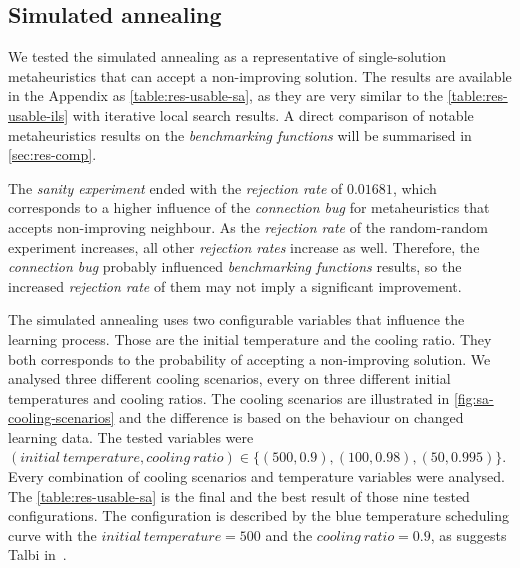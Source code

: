 \documentclass[
  print, %
  Table,   %
  nolof,     %
  nolot,     %
  11pt, %
  oneside  %
]{fithesis3}
\begin{document}
\subsection{Simulated annealing}
\label{subsec:res-ss-sa}

We tested the simulated annealing as a representative of single-solution metaheuristics that can accept a non-improving solution. The results are available in the Appendix as \cref{table:res-usable-sa}, as they are very similar to the \cref{table:res-usable-ils} with iterative local search results. A direct comparison of notable metaheuristics results on the \textit{benchmarking functions} will be summarised in \cref{sec:res-comp}.

The \textit{sanity experiment} ended with the \textit{rejection rate} of $0.01681$, which corresponds to a higher influence of the \textit{connection bug} for metaheuristics that accepts non-improving neighbour. As the \textit{rejection rate} of the random-random experiment increases, all other \textit{rejection rates} increase as well. Therefore, the \textit{connection bug} probably influenced \textit{benchmarking functions} results, so the increased \textit{rejection rate} of them may not imply a significant improvement.

The simulated annealing uses two configurable variables that influence the learning process. Those are the initial temperature and the cooling ratio. They both corresponds to the probability of accepting a non-improving solution. We analysed three different cooling scenarios, every on three different initial temperatures and cooling ratios. The cooling scenarios are illustrated in \cref{fig:sa-cooling-scenarios} and the difference is based on the behaviour on changed learning data. The tested variables were $(\mathit{initial~temperature, cooling~ratio}) \in \{ (500, 0.9), (100, 0.98), (50, 0.995) \}$. Every combination of cooling scenarios and temperature variables were analysed. The \cref{table:res-usable-sa} is the final and the best result of those nine tested configurations. The configuration is described by the blue temperature scheduling curve with the $\mathit{initial~temperature} = 500$ and the $\mathit{cooling~ratio} = 0.9$, as suggests Talbi in~\cite{talbi2009metaheuristics}.
\end{document}
